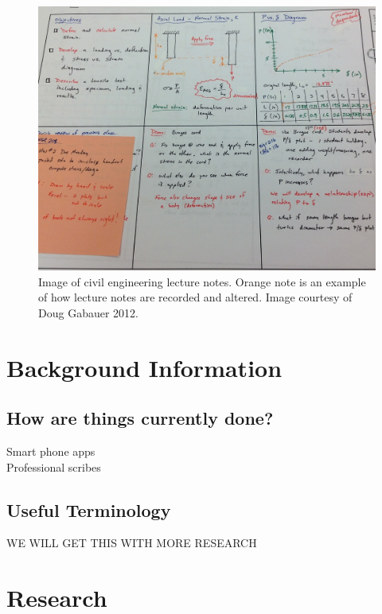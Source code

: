 \documentclass{article}
\begin{document}
		\begin{figure}[h]
      			\centering
      			\includegraphics[scale=0.2]{./images/cive-notes.png}
			\caption{Image of civil engineering lecture notes. Orange note is an example of how lecture notes are recorded and altered. Image courtesy of Doug Gabauer 2012.}
			\label{fig:cive-notes}
   		 \end{figure}
		
	\section*{Background Information}
		\subsection*{How are things currently done?}
			Smart phone apps\\
			Professional scribes
			
		\subsection*{Useful Terminology}
			WE WILL GET THIS WITH MORE RESEARCH
	
	\section*{Research}
\end{document}
